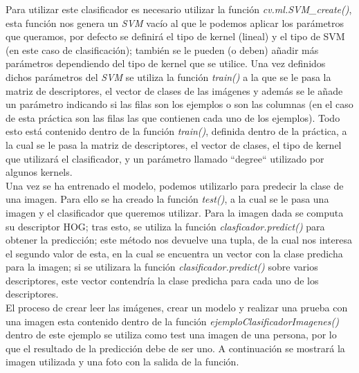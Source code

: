 Para utilizar este clasificador es necesario utilizar la función \textit{cv.ml.SVM\_create()}, esta función nos genera un \textit{SVM} vacío al que le podemos aplicar los parámetros que queramos, por defecto se definirá el tipo de kernel (lineal) y el tipo de SVM (en este caso de clasificación); también se le pueden (o deben) añadir más parámetros dependiendo del tipo de kernel que se utilice. Una vez definidos dichos parámetros del \textit{SVM} se utiliza la función \textit{train()} a la que se le pasa la matriz de descriptores, el vector de clases de las imágenes y además se le añade un parámetro indicando si las filas son los ejemplos o son las columnas (en el caso de esta práctica son las filas las que contienen cada uno de los ejemplos). Todo esto está contenido dentro de la función \textit{train()}, definida dentro de la práctica, a la cual se le pasa la matriz de descriptores, el vector de clases, el tipo de kernel que utilizará el clasificador, y un parámetro llamado ``degree`` utilizado por algunos kernels. \\

Una vez se ha entrenado el modelo, podemos utilizarlo para predecir la clase de una imagen. Para ello se ha creado la función \textit{test()}, a la cual se le pasa una imagen y el clasificador que queremos utilizar. Para la imagen dada se computa su descriptor HOG; tras esto, se utiliza la función \textit{clasficador.predict()} para obtener la predicción; este método nos devuelve una tupla, de la cual nos interesa el segundo valor de esta, en la cual se encuentra un vector con la clase predicha para la imagen; si se utilizara la función \textit{clasificador.predict()} sobre varios descriptores, este vector contendría la clase predicha para cada uno de los descriptores. \\

El proceso de crear leer las imágenes, crear un modelo y realizar una prueba con una imagen esta contenido dentro de la función \textit{ejemploClasificadorImagenes()} dentro de este ejemplo se utiliza como test una imagen de una persona, por lo que el resultado de la predicción debe de ser uno. A continuación se mostrará la imagen utilizada y una foto con la salida de la función. \\


